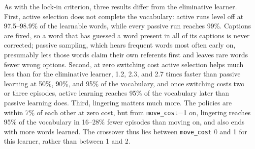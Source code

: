 \documentclass[11pt]{article}
\begin{document}
As with the lock-in criterion, three results differ from the eliminative learner. First, active selection does not complete the vocabulary: active runs level off at 97.5--98.9\% of the learnable words, while every passive run reaches 99\%. Captions are fixed, so a word that has guessed a word present in all of its captions is never corrected; passive sampling, which hears frequent words most often early on, presumably lets those words claim their own referents first and leaves rare words fewer wrong options. Second, at zero switching cost active selection helps much less than for the eliminative learner, 1.2, 2.3, and 2.7 times faster than passive learning at 50\%, 90\%, and 95\% of the vocabulary, and once switching costs two or three episodes, active learning reaches 95\% of the vocabulary later than passive learning does. Third, lingering matters much more. The policies are within 7\% of each other at zero cost, but from \texttt{move\_cost}=1 on, lingering reaches 95\% of the vocabulary in 16--28\% fewer episodes than moving on, and also ends with more words learned. The crossover thus lies between \texttt{move\_cost} 0 and 1 for this learner, rather than between 1 and 2.
\end{document}
